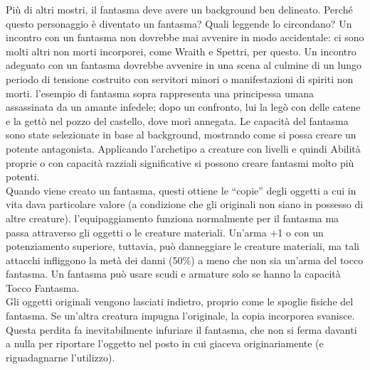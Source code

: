 \begin{multicols}{2}
Più di altri mostri, il fantasma deve avere un background ben delineato. Perché questo personaggio è diventato un fantasma? Quali leggende lo circondano? Un incontro con un fantasma non dovrebbe mai avvenire in modo accidentale: ci sono molti altri non morti incorporei, come Wraith e Spettri, per questo. Un incontro adeguato con un fantasma dovrebbe avvenire in una scena al culmine di un lungo periodo di tensione costruito con servitori minori o manifestazioni di spiriti non morti. l'esempio di fantasma sopra rappresenta una principessa umana assassinata da un amante infedele; dopo un confronto, lui la legò con delle catene e la gettò nel pozzo del castello, dove morì annegata. Le capacità del fantasma sono state selezionate in base al background, mostrando come si possa creare un potente antagonista. Applicando l'archetipo a creature con livelli e quindi Abilità proprie o con capacità razziali significative si possono creare fantasmi molto più potenti.\\

Quando viene creato un fantasma, questi ottiene le “copie” degli oggetti a cui in vita dava particolare valore (a condizione che gli originali non siano in possesso di altre creature). l'equipaggiamento funziona normalmente per il fantasma ma passa attraverso gli oggetti o le creature materiali. Un'arma +1 o con un potenziamento superiore, tuttavia, può danneggiare le creature materiali, ma tali attacchi infliggono la metà dei danni (50\%) a meno che non sia un'arma del tocco fantasma. Un fantasma può usare scudi e armature solo se hanno la capacità Tocco Fantasma.\\

Gli oggetti originali vengono lasciati indietro, proprio come le spoglie fisiche del fantasma. Se un'altra creatura impugna l'originale, la copia incorporea svanisce. Questa perdita fa inevitabilmente infuriare il fantasma, che non si ferma davanti a nulla per riportare l'oggetto nel posto in cui giaceva originariamente (e riguadagnarne l'utilizzo).\\


\end{multicols}
